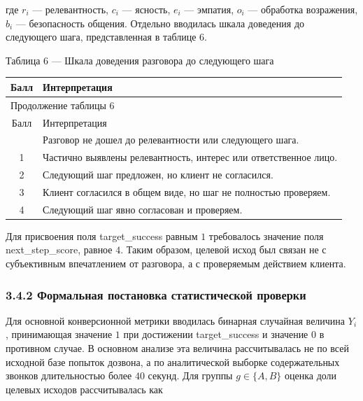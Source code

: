 \documentclass[a4paper,14pt]{extarticle}
\renewcommand{\texttt}[1]{\textnormal{#1}}
\newcounter{none}
\newcommand{\VkrTableCaption}[1]{%
  \Needspace{0.44\textheight}%
  \par\smallskip
  {\singlespacing\noindent #1\par}%
  \vspace{2pt}%
}
\begin{document}
где \(r_i\) --- релевантность, \(c_i\) --- ясность, \(e_i\) --- эмпатия,
\(o_i\) --- обработка возражения, \(b_i\) --- безопасность общения.
Отдельно вводилась шкала доведения до следующего шага, представленная в
таблице 6.

\VkrTableCaption{Таблица 6 --- Шкала доведения разговора до следующего шага}

{\def\LTcaptype{none} %
\begin{longtable}[]{|c|l|}
\hline
Балл & Интерпретация \\
\hline
\endfirsthead
\hline\multicolumn{2}{|l|}{\small Продолжение таблицы 6}\\
\hline
Балл & Интерпретация \\
\hline
\endhead
\hline
\endfoot
\hline
\endlastfoot
0 & Разговор не дошел до релевантности или следующего шага. \\
1 & Частично выявлены релевантность, интерес или ответственное лицо. \\
2 & Следующий шаг предложен, но клиент не согласился. \\
3 & Клиент согласился в общем виде, но шаг не полностью проверяем. \\
4 & Следующий шаг явно согласован и проверяем. \\
\end{longtable}
}

Для присвоения поля \texttt{target\_\allowbreak{}success} равным \(1\) требовалось
значение поля \texttt{next\_\allowbreak{}step\_\allowbreak{}score}, равное \(4\). Таким образом,
целевой исход был связан не с субъективным впечатлением от разговора, а
с проверяемым действием клиента.

\subsubsection{3.4.2 Формальная постановка статистической
проверки}\label{ux444ux43eux440ux43cux430ux43bux44cux43dux430ux44f-ux43fux43eux441ux442ux430ux43dux43eux432ux43aux430-ux441ux442ux430ux442ux438ux441ux442ux438ux447ux435ux441ux43aux43eux439-ux43fux440ux43eux432ux435ux440ux43aux438}

Для основной конверсионной метрики вводилась бинарная случайная величина
\(Y_i\), принимающая значение \(1\) при достижении
\texttt{target\_\allowbreak{}success} и значение \(0\) в противном случае. В основном
анализе эта величина рассчитывалась не по всей исходной базе попыток
дозвона, а по аналитической выборке содержательных звонков длительностью
более \(40\) секунд. Для группы \(g \in \{A, B\}\) оценка доли целевых
исходов рассчитывалась как
\end{document}

